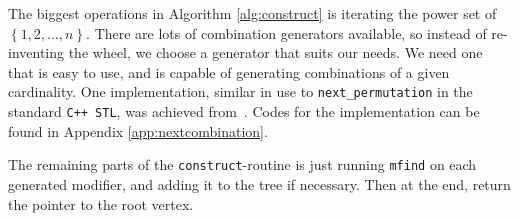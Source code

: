 The biggest operations in Algorithm \ref{alg:construct} is iterating the power
set of $\left\{1,2,\ldots,n\right\}$. There are lots of combination generators available, so
instead of re-inventing the wheel, we choose a generator that suits our needs.
We need one that is easy to use, and is capable of generating combinations of
a given cardinality. One implementation, similar in use to
\texttt{next\_permutation} in the standard \texttt{C++ STL}, was
achieved from~\cite{codeproject}.
Codes for the implementation can be found in Appendix
\ref{app:nextcombination}.

The remaining parts of the \texttt{construct}-routine is just running
\texttt{mfind} on each generated modifier, and adding it to the tree
if necessary. Then at the end, return the pointer to the root vertex.
